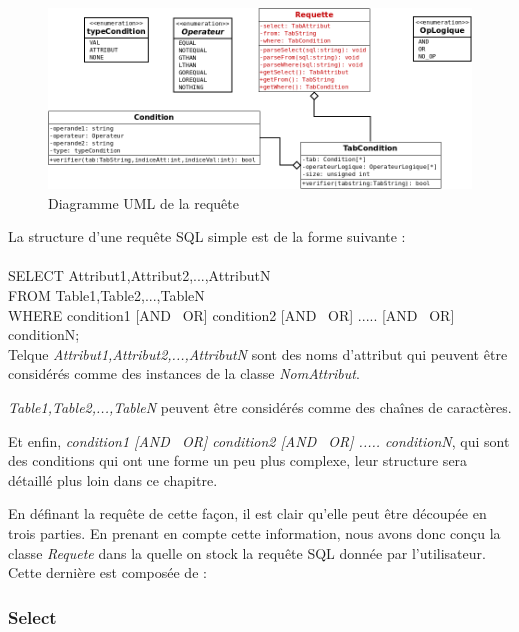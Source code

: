 \documentclass[oneside,13pt,a4paper]{report}
\begin{document}
\vfill

\begin{figure}[!h]
	\centering
	\includegraphics[width=1\textwidth]{img/requette.png}
	\vspace{0.1cm}
	\caption{Diagramme UML de la requête}
\end{figure}

\pagebreak

La structure d'une requête SQL simple est de la forme suivante : \\
\\SELECT Attribut1,Attribut2,...,AttributN\\FROM Table1,Table2,...,TableN\\WHERE condition1 [AND \textbar~OR] condition2 [AND \textbar~OR] ..... [AND \textbar~OR] conditionN;\\

Telque \textit{Attribut1,Attribut2,...,AttributN} sont des noms d'attribut qui peuvent être considérés comme des instances de la classe \textit{NomAttribut}.

\textit{Table1,Table2,...,TableN} peuvent être  considérés comme des chaînes de caractères.

Et enfin, \textit{condition1 [AND \textbar~OR] condition2 [AND \textbar~OR] ..... conditionN}, qui sont des conditions qui ont une forme un peu plus complexe, leur structure sera détaillé plus loin dans ce chapitre.

En définant la requête de cette façon, il est clair qu'elle peut être découpée en trois parties. En prenant en compte cette information, nous avons donc conçu la classe
\textit{Requete} dans la quelle on stock la requête SQL donnée par l'utilisateur. Cette dernière est composée de :

\subsubsection{Select}
\end{document}
